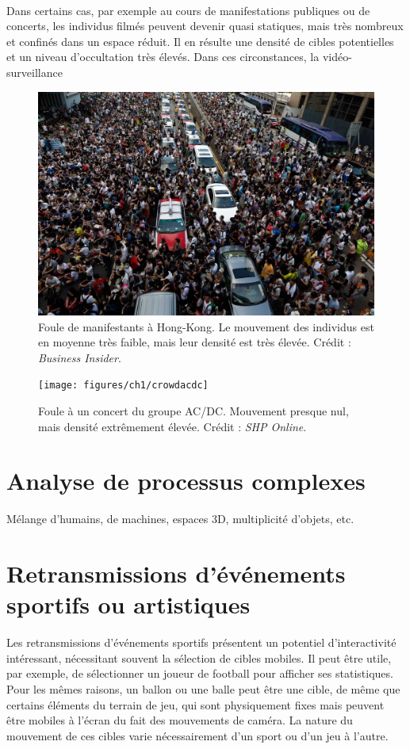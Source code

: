 	\paragraph*{}
	Dans certains cas, par exemple au cours de manifestations publiques ou de concerts, les individus filmés peuvent devenir quasi statiques, mais très nombreux et confinés dans un espace réduit. Il en résulte une densité de cibles potentielles et un niveau d'occultation très élevés. Dans ces circonstances, la vidéo-surveillance 
	
	\begin{figure}[H]
		\centering
		\includegraphics[width=\textwidth]{figures/ch1/crowdhk}
		\caption{Foule de manifestants à Hong-Kong. Le mouvement des individus est en moyenne très faible, mais leur densité est très élevée. Crédit : \emph{Business Insider}.}
		\label{fig:crowdhk}
	\end{figure}
	
	\begin{figure}[htb]
		\centering
		\texttt{[image: figures/ch1/crowdacdc]}
		\caption{Foule à un concert du groupe AC/DC. Mouvement presque nul, mais densité extrêmement élevée. Crédit : \emph{SHP Online}.}
		\label{fig:crowdacdc}
	\end{figure}
	
	
	
	\section{Analyse de processus complexes}
	Mélange d'humains, de machines, espaces 3D, multiplicité d'objets, etc.
	
	\section{Retransmissions d'événements sportifs ou artistiques}
	Les retransmissions d'événements sportifs présentent un potentiel d'interactivité intéressant, nécessitant souvent la sélection de cibles mobiles. Il peut être utile, par exemple, de sélectionner un joueur de football pour afficher ses statistiques. Pour les mêmes raisons, un ballon ou une balle peut être une cible, de même que certains éléments du terrain de jeu, qui sont physiquement fixes mais peuvent être mobiles à l'écran du fait des mouvements de caméra. La nature du mouvement de ces cibles varie nécessairement d'un sport ou d'un jeu à l'autre.
	
